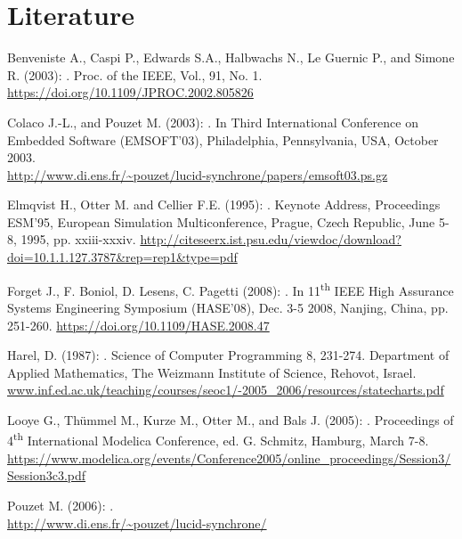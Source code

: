 \chapter{Literature}

Benveniste A., Caspi P., Edwards S.A., Halbwachs N., Le Guernic P., and Simone R. (2003):
.
Proc. of the IEEE, Vol., 91, No. 1.
\url{https://doi.org/10.1109/JPROC.2002.805826}

Colaco J.-L., and Pouzet M. (2003):
.
In Third International Conference on Embedded Software (EMSOFT'03), Philadelphia, Pennsylvania, USA, October 2003.\\
\url{http://www.di.ens.fr/~pouzet/lucid-synchrone/papers/emsoft03.ps.gz}

Elmqvist H., Otter M. and Cellier F.E. (1995):
.
Keynote Address, Proceedings ESM'95, European Simulation Multiconference, Prague, Czech Republic, June 5-8, 1995, pp. xxiii-xxxiv.
\url{http://citeseerx.ist.psu.edu/viewdoc/download?doi=10.1.1.127.3787\&rep=rep1\&type=pdf}

Forget J., F. Boniol, D. Lesens, C. Pagetti (2008):
.
In 11\textsuperscript{th} IEEE High Assurance Systems Engineering Symposium (HASE'08), Dec. 3-5 2008, Nanjing, China, pp. 251-260.
\url{https://doi.org/10.1109/HASE.2008.47}

Harel, D. (1987):
.
Science of Computer Programming 8, 231-274. Department of Applied Mathematics, The Weizmann Institute of Science, Rehovot, Israel.
\href{http://www.inf.ed.ac.uk/teaching/courses/seoc1/2005_2006/resources/statecharts.pdf}{www.inf.ed.ac.uk/teaching/courses/seoc1/-2005\_2006/resources/statecharts.pdf}

Looye G., Thümmel M., Kurze M., Otter M., and Bals J. (2005):
.
Proceedings of 4\textsuperscript{th} International Modelica Conference, ed. G. Schmitz, Hamburg, March 7-8.\\
\url{https://www.modelica.org/events/Conference2005/online_proceedings/Session3/Session3c3.pdf}

Pouzet M. (2006):
.\\
\url{http://www.di.ens.fr/~pouzet/lucid-synchrone/}

